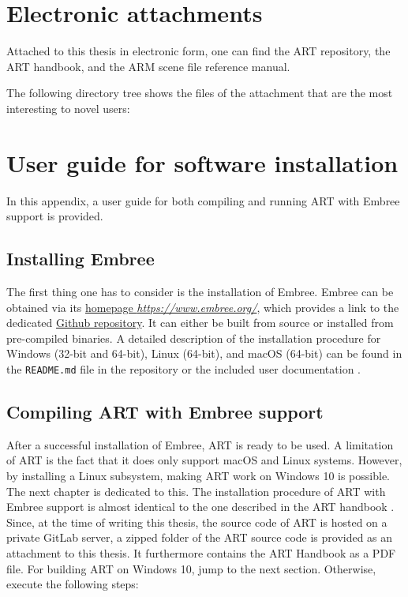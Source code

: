 \chapter{Electronic attachments} \label{chap:attachments}

Attached to this thesis in electronic form, one can find the ART repository, the ART handbook, and the ARM scene file reference manual.

The following directory tree shows the files of the attachment that are the most interesting to novel users:

\medspace


\chapter{User guide for software installation}

In this appendix, a user guide for both compiling and running ART with Embree support is provided. 

\section{Installing Embree}
\label{sec:embree_app}
The first thing one has to consider is the installation of Embree. Embree can be obtained via its \href{https://www.embree.org/}{homepage \emph{https://www.embree.org/}}, which provides a link to the dedicated \href{https://github.com/embree/embree}{Github repository}. It can either be built from source or installed from pre-compiled binaries. A detailed description of the installation procedure for Windows (32-bit and 64-bit), Linux (64-bit), and macOS (64-bit) can be found in the \texttt{README.md} file in the repository or the included user documentation \cite{embree2021Doc}.

\section{Compiling ART with Embree support}
\label{art}
After a successful installation of Embree, ART is ready to be used. A limitation of ART is the fact that it does only support macOS and Linux systems. However, by installing a Linux subsystem, making ART work on Windows 10 is possible. The next chapter is dedicated to this.
The installation procedure of ART with Embree support is almost identical to the one described in the ART handbook \cite{arthandbook}. Since, at the time of writing this thesis, the source code of ART is hosted on a private GitLab server, a zipped folder of the ART source code is provided as an attachment to this thesis. It furthermore contains the ART Handbook as a PDF file. For building ART on Windows 10, jump to the next section. Otherwise, execute the following steps:

